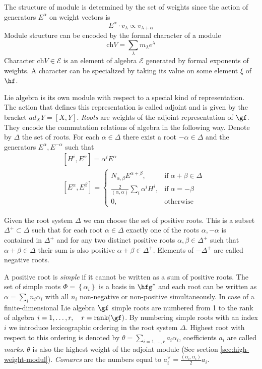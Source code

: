 The structure of module is determined by the set of weights since the action of generators $E^{\alpha}$ on weight vectors is
\begin{equation}
  \label{eq:5}
  E^{\alpha}\cdot v_{\lambda} \propto v_{\lambda+\alpha}
\end{equation}
Module structure can be encoded by the formal character of a module
\begin{equation}
  \label{eq:10}
  \mathrm{ch}V=\sum_{\lambda}m_{\lambda} e^{\lambda}
\end{equation}
Character  $\mathrm{ch}V\in \mathcal{E}$ is an element of algebra $\mathcal{E}$ generated by formal exponents of weights.
A character can be specialized by taking its value on some element $\xi$ of $\hf$.

Lie algebra is its own module with respect to a special kind of representation. The action that
defines this representation is called adjoint and is given by the bracket $ad_{X} Y=[X,Y]$. 
{\it Roots} are weights of the adjoint representation of $\gf$. They encode the commutation relations of algebra in the following way. Denote by $\Delta$ the set of roots. For each $\alpha\in \Delta$ there exist a root $-\alpha\in \Delta$ and the generators $E^{\alpha}, E^{-\alpha}$ such that
\begin{align}
  \label{eq:4}
  &  [H^{i},E^{\alpha}]=\alpha^{i}E^{\alpha} \\
  &\left[E^{\alpha},E^{\beta}\right]=
  \begin{cases}
    N_{\alpha,\beta} E^{\alpha+\beta}, & \mbox{if}\; \alpha+\beta\in \Delta\\
    \frac{2}{(\alpha,\alpha)} \sum_{i}\alpha^{i} H^{i},&  \mbox{if}\; \alpha=-\beta\\
    0,&\mbox{otherwise}
  \end{cases}
\end{align}

Given the root system $\Delta$ we can choose the set of positive roots. This is a subset  $\Delta^{+}\subset \Delta$ such that for each root $\alpha\in\Delta$ exactly one of the roots $\alpha, -\alpha$ is contained in $\Delta^{+}$ and for any two distinct positive roots $\alpha, \beta\in \Delta^{+}$ such that $\alpha+\beta\in \Delta$ their sum is also positive $\alpha+\beta\in\Delta^{+}$.
Elements of $-\Delta^{+}$ are called negative roots.

A positive root is {\it simple} if it cannot be written as a sum of positive roots. The set of simple roots $\Phi=\left\{\alpha_{i}\right\}$ is a basis in $\hfg^{*}$ and each root can be written as $\alpha=\sum_{i}n_{i}\alpha_{i}$ with all $n_{i}$ non-negative or non-positive simultaneously. In case of a finite-dimensional Lie algebra $\gf$ simple roots are numbered from 1 to the rank of algebra $i=1,\dots,r,\quad r=\mathrm{rank}(\gf)$. By numbering simple roots with an index $i$ we introduce lexicographic ordering in the root system $\Delta$. Highest root with respect to this ordering is denoted by  $\theta=\sum_{i=1,\dots,r} a_i \alpha_i$, coefficients $a_i$ are called {\it marks}. $\theta$ is also the highest weight  of the adjoint module (See section \ref{sec:high-weight-modul}). {\it Comarcs} are the numbers equal to $a_i^{\vee}=\frac{(\alpha_i,\alpha_i)}{2} a_i$.

